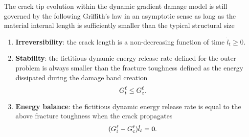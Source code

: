 \begin{proposition} \label{prop:whenellpetit}
The crack tip evolution within the dynamic gradient damage model is still governed by the following Griffith's law in an asymptotic sense as long as the material internal length is sufficiently smaller than the typical structural size
\begin{enumerate}
\item \textbf{Irreversibility}: the crack length is a non-decreasing function of time $\dot{l}_t\geq 0$.
\item \textbf{Stability}: the fictitious dynamic energy release rate defined for the outer problem is always smaller than the fracture toughness defined as the energy dissipated during the damage band creation
\[
G_t^\ell\leq G_\mathrm{c}^\ell.
\] 
\item \textbf{Energy balance}: the fictitious dynamic energy release rate is equal to the above fracture toughness when the crack propagates
\[
(G_t^\ell-G_\mathrm{c}^\ell)\dot{l}_t=0.
\] 
\end{enumerate}
\end{proposition}

